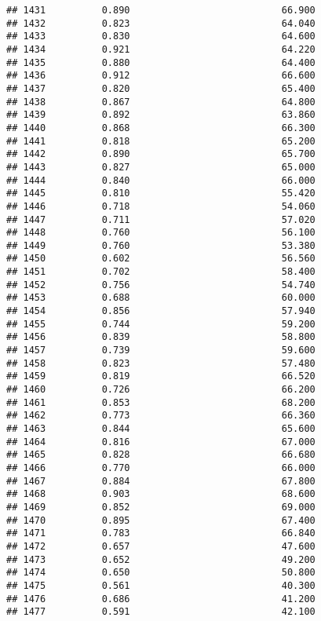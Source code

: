 \documentclass[
]{article}
\begin{document}
\begin{verbatim}
## 1431          0.890                           66.900
## 1432          0.823                           64.040
## 1433          0.830                           64.600
## 1434          0.921                           64.220
## 1435          0.880                           64.400
## 1436          0.912                           66.600
## 1437          0.820                           65.400
## 1438          0.867                           64.800
## 1439          0.892                           63.860
## 1440          0.868                           66.300
## 1441          0.818                           65.200
## 1442          0.890                           65.700
## 1443          0.827                           65.000
## 1444          0.840                           66.000
## 1445          0.810                           55.420
## 1446          0.718                           54.060
## 1447          0.711                           57.020
## 1448          0.760                           56.100
## 1449          0.760                           53.380
## 1450          0.602                           56.560
## 1451          0.702                           58.400
## 1452          0.756                           54.740
## 1453          0.688                           60.000
## 1454          0.856                           57.940
## 1455          0.744                           59.200
## 1456          0.839                           58.800
## 1457          0.739                           59.600
## 1458          0.823                           57.480
## 1459          0.819                           66.520
## 1460          0.726                           66.200
## 1461          0.853                           68.200
## 1462          0.773                           66.360
## 1463          0.844                           65.600
## 1464          0.816                           67.000
## 1465          0.828                           66.680
## 1466          0.770                           66.000
## 1467          0.884                           67.800
## 1468          0.903                           68.600
## 1469          0.852                           69.000
## 1470          0.895                           67.400
## 1471          0.783                           66.840
## 1472          0.657                           47.600
## 1473          0.652                           49.200
## 1474          0.650                           50.800
## 1475          0.561                           40.300
## 1476          0.686                           41.200
## 1477          0.591                           42.100

\end{verbatim}
\end{document}
